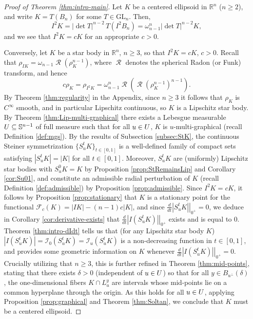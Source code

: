 \documentclass[11pt]{article}
\theoremstyle{definition}
\theoremstyle{proof}
\newcommand{\dt}[1]{\left . \frac{d}{dt} #1 \right |_{0^+}}
\DeclareMathOperator{\+}{\mathop{\tilde{+}}}
\DeclareMathOperator{\Rad}{\mathcal{R}}
\newcommand{\GL}{\textrm{GL}}
\newcommand{\R}{\mathbb{R}}
\renewcommand{\S}{\mathbb{S}}
\newcommand{\F}{\mathcal{F}}
\newcommand{\I}{\mathcal{I}}
\numberwithin{equation}{section}
\numberwithin{equation}{section}
\begin{document}
\begin{proof}[Proof of Theorem \ref{thm:intro-main}] 
Let $K$ be a centered ellipsoid in $\R^n$ ($n \geq 2$), and write $K = T(B_n)$ for some $T \in \GL_n$. Then,
\[
I^2 K = |\det T|^{n-2} \, T(I^2 B_n) = \omega_{n-1}^n |\det T|^{n-2} K ,
\]
and we see that $I^2 K = c K$ for an appropriate $c > 0$.

Conversely, let $K$ be a star body in $\R^n$, $n \geq 3$, so that $I^2 K = c K$, $c > 0$. Recall that $\rho_{I K} = \omega_{n-1} \Rad(\rho_K^{n-1})$, where $\Rad$ denotes the spherical Radon (or Funk) transform, and hence
\begin{equation} \label{eq:RadRad}
c \rho_K = \rho_{I^2 K} = \omega_{n-1}^n \Rad(\Rad(\rho_K^{n-1})^{n-1}) .
\end{equation}
By Theorem \ref{thm:regularity} in the Appendix, since $n \geq 3$ it follows that $\rho_K$ is $C^\infty$ smooth, and in particular Lipschitz continuous, so $K$ is a Lipschitz star body. By Theorem \ref{thm:Lip-multi-graphical} there exists a Lebesgue measurable $\U \subseteq \S^{n-1}$ of full measure such that for all $u \in U$, $K$ is $u$-multi-graphical (recall Definition \ref{def:mgs}). By the results of Subsection \ref{subsec:StK}, the continuous Steiner symmetrization $\{S_u^t K\}_{t \in [0,1]}$ is a well-defined family of compact sets satisfying $|S_u^t K| = |K|$ for all $t \in [0,1]$. Moreover,  $S_u^t K$ are (uniformly) Lipschitz star bodies with $S_u^0 K = K$ by Proposition \ref{prop:StRemainsLip} and Corollary \ref{cor:Su01}, and constitute an admissible radial perturbation of $K$ (recall Definition \ref{def:admissible}) by Proposition \ref{prop:admissible}. Since $I^2 K = c K$, it follows by Proposition \ref{prop:stationary} that $K$ is a stationary point for the functional $\F_c(K) = |I K| - (n-1) c |K|$, and since $\dt{|S_u^t K|}= 0$, we deduce in Corollary \ref{cor:derivative-exists} that $\dt{|I(S_u^t K)|}$ exists and is equal to $0$. Theorem \ref{thm:intro-dIdt} tells us that (for any Lipschitz star body $K$) $|I(S_u^t K)| = \I_0(S_u^t K) = \I_u(S_u^t K)$ is a non-decreasing function in $t \in [0,1]$, and provides some geometric information on $K$ whenever $\dt{|I(S_u^t K)|} = 0$. Crucially utilizing that $n \geq 3$, this is further refined in Theorem \ref{thm:mid-points}, stating that there exists $\delta > 0$ (independent of $u \in U$) so that for all $y \in B_{u^{\perp}}(\delta)$, the one-dimensional fibers $K \cap L_u^y$ are intervals whose mid-points lie on a common hyperplane through the origin. As this holds for all $u \in U$, applying Proposition \ref{prop:graphical} and Theorem \ref{thm:Soltan}, we conclude that $K$ must be a centered ellipsoid. 
\end{proof}
\end{document}
